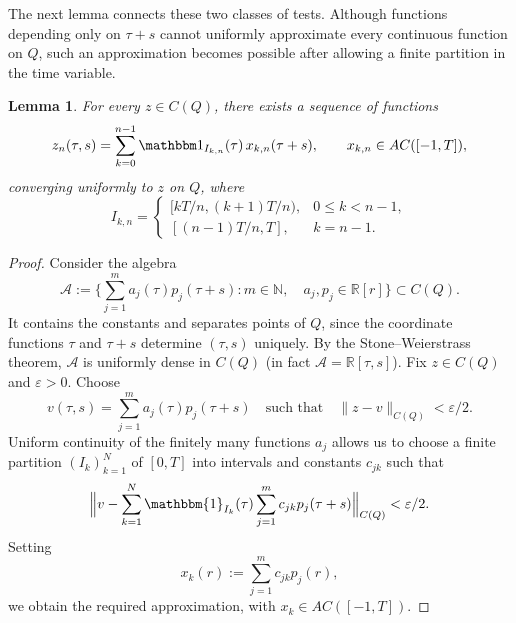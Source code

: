 \documentclass[reqno]{amsart}
\theoremstyle{plain}
\newtheorem{lemma}{Lemma}[section]
\numberwithin{equation}{section}
\numberwithin{definition}{section}
\newcommand\RR{\ensuremath{\mathbb{R}}}
\begin{document}
{The next lemma connects these two classes of tests.
Although functions depending only on $\tau+s$ cannot
uniformly approximate every continuous function on $Q$,
such an approximation becomes possible after allowing
a finite partition in the time variable.

\begin{lemma}\label{lem:delay-test-approximation}
For every $z\in C(Q)$, there exists a sequence
of functions
\begin{equation*}
    z_n(\tau,s)
    =
    \sum_{k=0}^{n-1}
    \mathbbm 1_{I_{k,n}}(\tau)\,x_{k,n}(\tau+s),
    \qquad
    x_{k,n}\in AC([-1,T]),
\end{equation*}
converging uniformly to $z$ on $Q$, where
\begin{equation*}
    I_{k,n}
    =
    \begin{cases}
        [kT/n,(k+1)T/n),
        & 0\le k<n-1,\\
        [(n-1)T/n,T],
        & k=n-1.
    \end{cases}
\end{equation*}
\end{lemma}

\begin{proof}
Consider the algebra
\begin{equation*}
    \mathcal A
    :=
    \Big\{
        \sum_{j=1}^{m}a_j(\tau)p_j(\tau+s):
        m\in\mathbb N,\quad a_j,p_j\in\mathbb R[r]
    \Big\}
    \subset C(Q).
\end{equation*}
It contains the constants and separates points of $Q$,
since the coordinate functions $\tau$ and $\tau+s$
determine $(\tau,s)$ uniquely.
By the Stone--Weierstrass theorem,
$\mathcal A$ is uniformly dense in $C(Q)$ (in fact $\mathcal{A}=\RR[\tau,s]$). Fix $z\in C(Q)$ and $\varepsilon>0$. Choose
\begin{equation*}
    v(\tau,s)=\sum_{j=1}^{m}a_j(\tau)p_j(\tau+s)
    \quad\text{such that}\quad
    \|z-v\|_{C(Q)}<\varepsilon/2.
\end{equation*}
Uniform continuity of the finitely many functions $a_j$
allows us to choose a finite partition $(I_k)_{k=1}^{N}$
of $[0,T]$ into intervals and constants $c_{jk}$ such that
\begin{equation*}
    \Big\|
        v-
        \sum_{k=1}^{N}\mathbbm{1}_{I_k}(\tau)
        \sum_{j=1}^{m}c_{jk}p_j(\tau+s)
    \Big\|_{C(Q)}
    <\varepsilon/2.
\end{equation*}
Setting
\begin{equation*}
    x_k(r):=\sum_{j=1}^{m}c_{jk}p_j(r),
\end{equation*}
we obtain the required approximation, with
$x_k\in AC([-1,T])$.
\end{proof}

}
\end{document}
